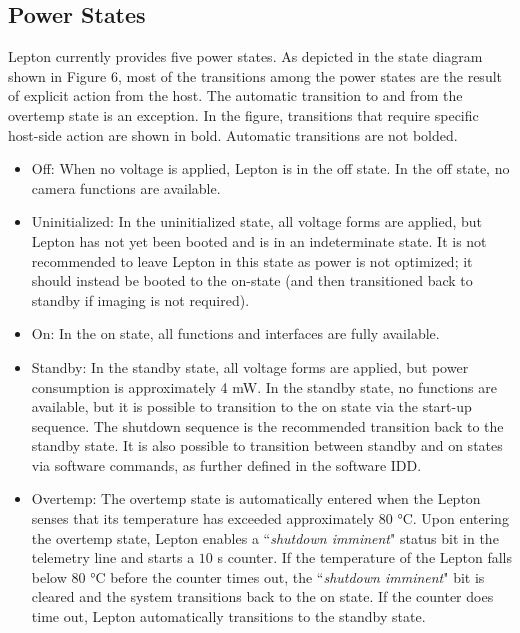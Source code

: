 \subsection{Power States}
\label{ssec:powerstate}
Lepton currently provides five power states. As depicted in the state diagram
shown in Figure 6, most of the transitions among the power states are the result
of explicit action from the host. The automatic transition to and from the
overtemp state is an exception. In the figure, transitions that require specific
host-side action are shown in bold. Automatic transitions are not bolded.
%
\begin{itemize}
    \item Off: When no voltage is applied, Lepton is in the off
state. In the off state, no camera functions are available.
    \item Uninitialized:
In the uninitialized state, all voltage forms are applied, but Lepton has not
yet been booted and is in an indeterminate state. It is not recommended to leave
Lepton in this state as power is not optimized; it should instead be booted to
the on-state (and then transitioned back to standby if imaging is not required).
    \item On: In the on state, all functions and interfaces are fully available.
    \item Standby: In the standby state, all voltage forms are applied, but power
consumption is approximately 4 \si{\milli\watt}. In the standby state, no
functions are available, but it is possible to transition to the on state via
the start-up sequence. The shutdown sequence is the recommended transition back to the standby
state. It is also possible to transition between standby and on states via
software commands, as further defined in the software IDD.
    \item Overtemp: The
overtemp state is automatically entered when the Lepton senses that its
temperature has exceeded approximately $80$ \si{\celsius}. Upon entering the
overtemp state, Lepton enables a ``\emph{shutdown imminent}" status bit in the
telemetry line and starts a $10$ \si{\second} counter. If the temperature of the
Lepton falls below $80$ \si{\celsius} before the counter times out, the
``\emph{shutdown imminent}" bit is cleared and the system transitions back to
the on state. If the counter does time out, Lepton automatically transitions to
the standby state.
\end{itemize}
%
